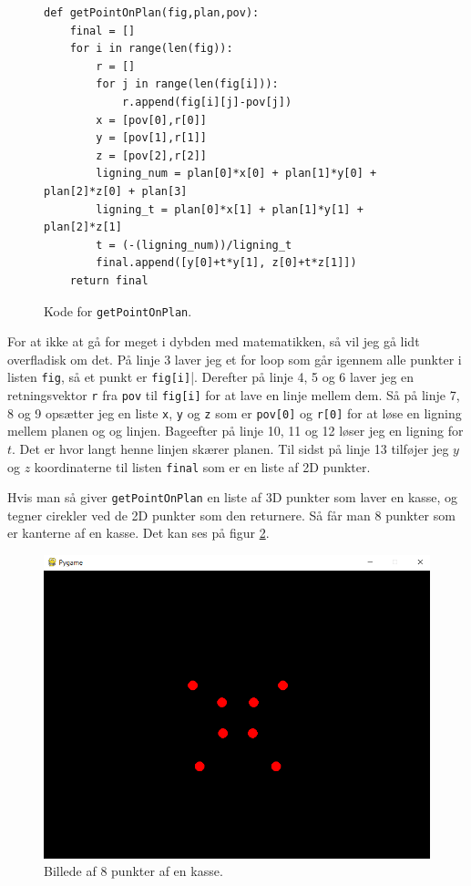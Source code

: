 \documentclass{article}
\begin{document}
\begin{figure}[H]
\begin{verbatim}
def getPointOnPlan(fig,plan,pov):
    final = []
    for i in range(len(fig)):
        r = []
        for j in range(len(fig[i])):
            r.append(fig[i][j]-pov[j])
        x = [pov[0],r[0]]
        y = [pov[1],r[1]]
        z = [pov[2],r[2]]
        ligning_num = plan[0]*x[0] + plan[1]*y[0] + plan[2]*z[0] + plan[3]
        ligning_t = plan[0]*x[1] + plan[1]*y[1] + plan[2]*z[1]
        t = (-(ligning_num))/ligning_t
        final.append([y[0]+t*y[1], z[0]+t*z[1]])
    return final
\end{verbatim}
\caption{\label{fig:getPointOnPlan}Kode for \texttt{getPointOnPlan}.}
\end{figure}

For at ikke at gå for meget i dybden med matematikken, så vil jeg gå lidt overfladisk om det.
På linje 3 laver jeg et for loop som går igennem alle punkter i listen \texttt{fig}, så et punkt er \texttt{fig[i]}|.
Derefter på linje 4, 5 og 6 laver jeg en retningsvektor \texttt{r} fra \texttt{pov} til \texttt{fig[i]} for at lave en linje mellem dem.
Så på linje 7, 8 og 9 opsætter jeg en liste \texttt{x}, \texttt{y} og \texttt{z} som er \texttt{pov[0]} og \texttt{r[0]} for at løse en ligning mellem planen og og linjen.
Bageefter på linje 10, 11 og 12 løser jeg en ligning for $t$. Det er hvor langt henne linjen skærer planen.
Til sidst på linje 13 tilføjer jeg $y$ og $z$ koordinaterne til listen \texttt{final} som er en liste af 2D punkter.

Hvis man så giver \texttt{getPointOnPlan} en liste af 3D punkter som laver en kasse, 
og tegner cirekler ved de 2D punkter som den returnere.
Så får man 8 punkter som er kanterne af en kasse. Det kan ses på figur \ref{fig:8dots}.
\begin{figure}[H]
\centering
\includegraphics[width=0.7\linewidth]{8dots.png}
\caption{\label{fig:8dots}Billede af 8 punkter af en kasse.}
\end{figure}    
\end{document}
